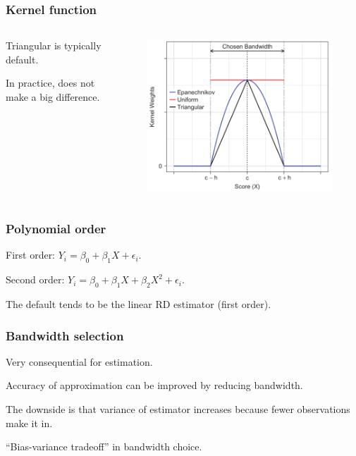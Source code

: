 \documentclass[12pt,english,dvipsnames,aspectratio=169,handout]{beamer}\usepackage[]{graphicx}\usepackage[]{xcolor}
\begin{document}
\begin{frame}
\frametitle{Kernel function}

\begin{columns}
	\begin{column}{0.3\textwidth}
	  \footnotesize
		Triangular is typically default.\bigskip
		
		In practice, does not make a big difference.
	\end{column}
	\begin{column}{0.7\textwidth}
		\begin{figure}
			\centering
			\includegraphics[scale=0.5]{../04-figures/07/07.PNG}
			\caption{\cite{cattaneo_practical_2019}}
		\end{figure}
	\end{column}
\end{columns}

\end{frame}


\begin{frame}
\frametitle{Polynomial order}

First order: $Y_i = \beta_0 + \beta_1X + \epsilon_i$.

Second order: $Y_i = \beta_0 + \beta_1X + \beta_2X^2 + \epsilon_i$.\bigskip
\pause

The default tends to be the linear RD estimator (first order).

\end{frame}



\begin{frame}
\frametitle{Bandwidth selection}
Very consequential for estimation.\bigskip
\pause

Accuracy of approximation can be improved by reducing bandwidth.\bigskip
\pause

The downside is that variance of estimator increases because fewer observations make it in.\bigskip
\pause

``Bias-variance tradeoff'' in bandwidth choice.

\end{frame}
\end{document}
